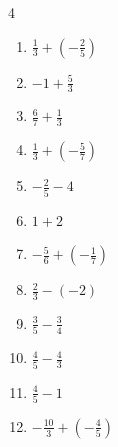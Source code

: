 \begin{multicols}{4}
\begin{enumerate}
  \item $\displaystyle \frac{1}{3} + \left(-\frac{2}{5}\right)$


  \item $\displaystyle -1 + \frac{5}{3}$


  \item $\displaystyle \frac{6}{7} + \frac{1}{3}$


  \item $\displaystyle \frac{1}{3} + \left(-\frac{5}{7}\right)$


  \item $\displaystyle -\frac{2}{5} - 4$


  \item $\displaystyle 1 + 2$

        \phantom{$\displaystyle =3$}

  \item $\displaystyle -\frac{5}{6} + \left(-\frac{1}{7}\right)$


\columnbreak %

  \item $\displaystyle \frac{2}{3} - \left(-2\right)$


  \item $\displaystyle \frac{3}{5} - \frac{3}{4}$


  \item $\displaystyle \frac{4}{5} - \frac{4}{3}$


  \item $\displaystyle \frac{4}{5} - 1$


  \item $\displaystyle -\frac{10}{3} + \left(-\frac{4}{5}\right)$


\end{enumerate}
\end{multicols}
